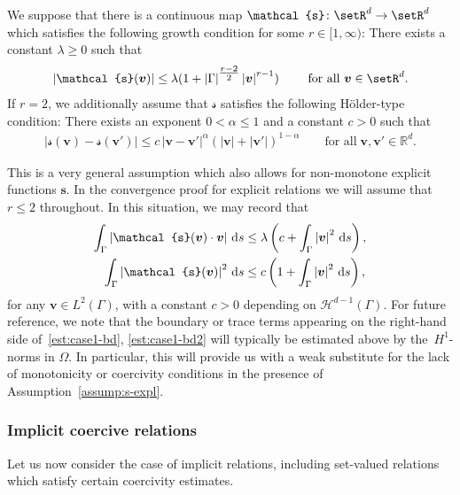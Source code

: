 \documentclass[reqno,a4paper]{amsart}
\def\abs#1{\left| #1 \right|}
\def\vec#1{\boldsymbol{#1}}
\def\R{\mathbb{R}}
\def\d{{\rm d}}
\def\ds{\,\d s}
\def\bs{\vec{s}}
\def\bv{\vec{v}}
\def\Srel{\vec{\mathcal{s}}}
\begin{document}
	\begin{assumption}\label{assump:s-expl}
		We suppose that there is a continuous map $\Srel \colon \setR^d \to \setR^d$ which satisfies the following growth condition for some $r\in [1,\infty)$: 
		There exists a constant $\lambda\geq 0$ such that
		\begin{align*}
			\abs{ \Srel(\bv)} \leq \lambda (1 +  \abs{\Gamma}^{\tfrac{r-2}{2}}
			\abs{\bv}^{r-1})  \qquad \text{ for all } \bv \in \setR^d. 
		\end{align*}
		{If $r=2$, we additionally assume that $\Srel$ satisfies the following H\"{o}lder-type condition: There exists an exponent $0<\alpha\leq 1$ and a constant $c>0$ such that 
			\begin{align}\label{eq:condo-1}
				|\Srel(\bv)-\Srel(\bv')| \leq c\, |\bv-\bv'|^{\alpha}(|\bv|+|\bv'|)^{1-\alpha}\qquad\text{for all}\;\bv,\bv'\in\R^{d}.
		\end{align}}
	\end{assumption}
	
	This is a very general assumption which also allows for non-monotone explicit functions $\mathcal{\bs}$. 
	In the convergence proof for explicit relations we will assume that $r \leq 2$ throughout. 
	In this situation, we may record that
	\begin{align}\label{est:case1-bd}
		\int_{\Gamma }\abs{\Srel(\bv) \cdot \bv} \ds &\leq \lambda   \left(c + \int_{\Gamma}\abs{\bv}^2  \ds \right),\\ \label{est:case1-bd2}
		\int_{\Gamma }\abs{\Srel(\bv)}^2 \ds &\leq c  \left( 1 +  \int_{\Gamma}\abs{\bv}^2  \ds \right), %
	\end{align}
	for any $\bv \in L^2(\Gamma)$, with a constant $c>0$ depending on $\mathcal{H}^{d-1}(\Gamma)$. 
	For future reference, we note that the boundary or trace terms appearing on the right-hand side of~\eqref{est:case1-bd}, \eqref{est:case1-bd2} will typically be estimated above by the~$H^{1}$-norms in $\Omega$. 
	In particular, this will provide us with a weak substitute for the lack of monotonicity or coercivity conditions in the presence of Assumption~\ref{assump:s-expl}.
	
	\subsubsection{Implicit coercive relations}\label{sec:impl-mon-rel} 
	Let us now consider the case of implicit relations, including set-valued relations which satisfy certain coercivity estimates. 
	
\end{document}
